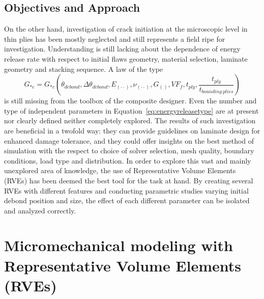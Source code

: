 \documentclass[a4paper]{jpconf}
\begin{document}
\subsection{Objectives and Approach}
On the other hand, investigation of crack initiation at the microscopic level in thin plies has been mostly neglected and still represents a field ripe for investigation. Understanding is still lacking about the dependence of energy release rate with respect to initial flaws geometry, material selection, laminate geometry and stacking sequence. A law of the type
\begin{equation}
\label{eq:energyreleasetype}
G_{*c}=G_{*c}\left(\theta_{debond},\Delta\theta_{debond}, E_{\left(\cdot\cdot\right)}, \nu_{\left(\cdot\cdot\right)}, G_{\left(\right)},VF_{f}, t_{ply}, \frac{t_{ply}}{t_{bounding\ plies}}\right)
\end{equation}
is still missing from the toolbox of the composite designer. Even the number and type of independent parameters in Equation~\ref{eq:energyreleasetype} are at present nor clearly defined neither completely explored. The results of such investigation are beneficial in a twofold way: they can provide guidelines on laminate design for enhanced damage tolerance, and they could offer insights on the best method of simulation with the respect to choice of solver selection, mesh quality, boundary conditions, load type and distribution. In order to explore this vast and mainly unexplored area of knowledge, the use of Representative Volume Elements (RVEs) has been deemed the best tool for the task at hand. By creating several RVEs with different features and conducting parametric studies varying initial debond position and size, the effect of each different parameter can be isolated and analyzed correctly.


\section{Micromechanical modeling with Representative Volume Elements (RVEs)}
\end{document}
